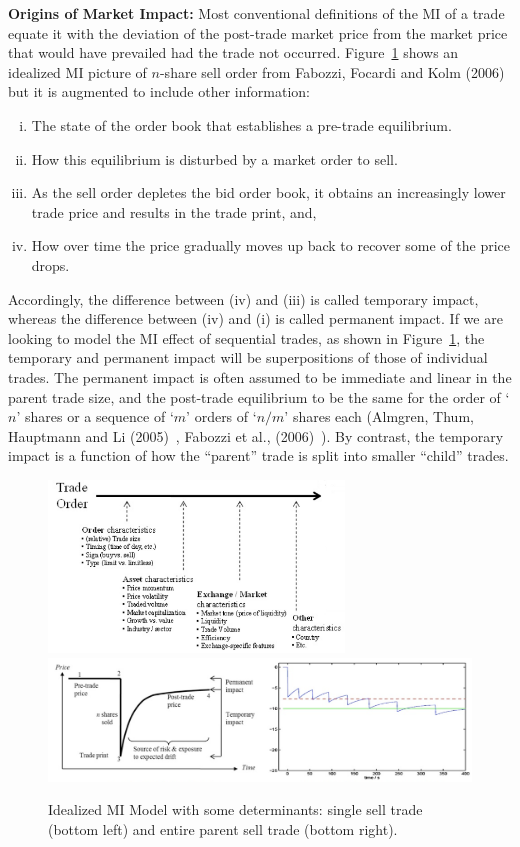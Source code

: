 \noindent\textbf{Origins of Market Impact:} \label{in:permimp} Most conventional definitions of the MI of a trade equate it with the deviation of the post-trade market price from the market price that would have prevailed had the trade not occurred. Figure~\ref{fig:marketimpt} shows an idealized MI picture of $n$-share sell order from Fabozzi, Focardi and Kolm (2006)~\cite{ffk} but it is augmented to include other information:
	\begin{enumerate}[(i)]
	\item The state of the order book that establishes a pre-trade equilibrium.
	\item How this equilibrium is disturbed by a market order to sell.
	\item As the sell order depletes the bid order book, it obtains an increasingly lower trade price and results in the trade print, and, 
	\item How over time the price gradually moves up back to recover some of the price drops.
	\end{enumerate}
Accordingly, the difference between (iv) and (iii) is called temporary impact, whereas the difference between (iv) and (i) is called permanent impact. If we are looking to model the MI effect of sequential trades, as shown in Figure~\ref{fig:marketimpt}, the temporary and permanent impact will be superpositions of those of individual trades. The permanent impact is often assumed to be immediate and linear in the parent trade size, and the post-trade equilibrium to be the same for the order of `$n$' shares or a sequence of `$m$' orders of `$n/m$' shares each (Almgren, Thum, Hauptmann and Li (2005)~\cite{athl}, Fabozzi et al., (2006)~\cite{ffk}). By contrast, the temporary impact is a function of how the ``parent'' trade is split into smaller ``child'' trades.\label{in:tempimpact}

	\begin{figure}[!ht]
	\centering
	\includegraphics[width=0.7\textwidth]{chapters/chapter_mi_models/figures/fig2b.png}
	\includegraphics[width=\textwidth]{chapters/chapter_mi_models/figures/fig1ab2.png}
	\caption{Idealized MI Model with some determinants: single sell trade (bottom left) and entire parent sell trade (bottom right).\label{fig:marketimpt}}
	\end{figure}


